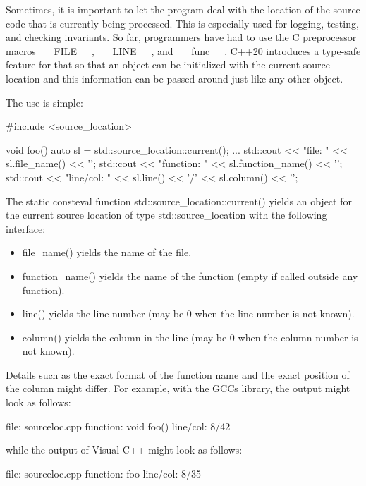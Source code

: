 Sometimes, it is important to let the program deal with the location of the source code that is currently being processed. This is especially used for logging, testing, and checking invariants. So far, programmers have had to use the C preprocessor macros \_\_FILE\_\_, \_\_LINE\_\_, and \_\_func\_\_. C++20 introduces a type-safe feature for that so that an object can be initialized with the current source location and this information can be passed around just like any other object.

The use is simple:

\begin{cpp}
#include <source_location>

void foo()
{
	auto sl = std::source_location::current();
	...
	std::cout << "file: " << sl.file_name() << '\n';
	std::cout << "function: " << sl.function_name() << '\n';
	std::cout << "line/col: " << sl.line() << '/' << sl.column() << '\n';
}
\end{cpp}

The static consteval function std::source\_location::current() yields an object for the current source location of type std::source\_location with the following interface:

\begin{itemize}
\item 
file\_name() yields the name of the file.

\item 
function\_name() yields the name of the function (empty if called outside any function).

\item 
line() yields the line number (may be 0 when the line number is not known).

\item 
column() yields the column in the line (may be 0 when the column number is not known).
\end{itemize}

Details such as the exact format of the function name and the exact position of the column might differ. For example, with the GCCs library, the output might look as follows:

\begin{shell}
file:     sourceloc.cpp
function: void foo()
line/col: 8/42
\end{shell}

while the output of Visual C++ might look as follows:

\begin{shell}
file:     sourceloc.cpp
function: foo
line/col: 8/35
\end{shell}

